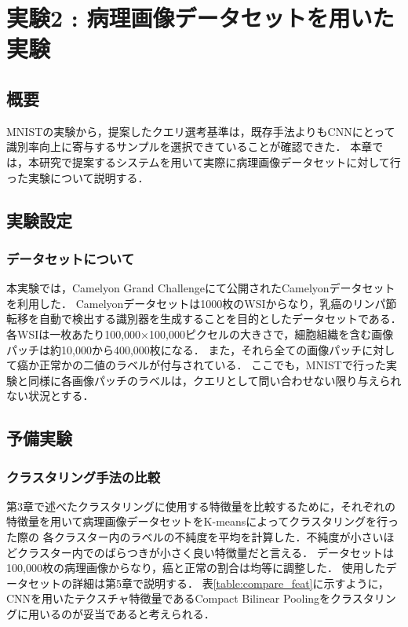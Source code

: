 \chapter{実験2 : 病理画像データセットを用いた実験}
\section{概要}
MNISTの実験から，提案したクエリ選考基準は，既存手法よりもCNNにとって識別率向上に寄与するサンプルを選択できていることが確認できた．
本章では，本研究で提案するシステムを用いて実際に病理画像データセットに対して行った実験について説明する．

\section{実験設定}
\subsection{データセットについて}
本実験では，Camelyon Grand Challenge\cite{Camelyon17}にて公開されたCamelyonデータセットを利用した．
Camelyonデータセットは1000枚のWSIからなり，乳癌のリンパ節転移を自動で検出する識別器を生成することを目的としたデータセットである．
各WSIは一枚あたり100,000×100,000ピクセルの大きさで，細胞組織を含む画像パッチは約10,000から400,000枚になる．
また，それら全ての画像パッチに対して癌か正常かの二値のラベルが付与されている．
ここでも，MNISTで行った実験と同様に各画像パッチのラベルは，クエリとして問い合わせない限り与えられない状況とする．

\section{予備実験}

\subsection{クラスタリング手法の比較}
第3章で述べたクラスタリングに使用する特徴量を比較するために，それぞれの特徴量を用いて病理画像データセットをK-meansによってクラスタリングを行った際の
各クラスター内のラベルの不純度を平均を計算した．不純度が小さいほどクラスター内でのばらつきが小さく良い特徴量だと言える．
データセットは100,000枚の病理画像からなり，癌と正常の割合は均等に調整した．
使用したデータセットの詳細は第5章で説明する．
表\ref{table:compare_feat}に示すように，CNNを用いたテクスチャ特徴量であるCompact Bilinear Poolingをクラスタリングに用いるのが妥当であると考えられる．

